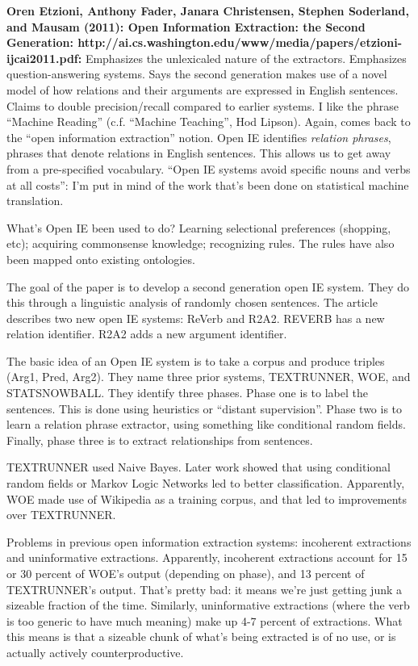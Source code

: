 \textbf{Oren Etzioni, Anthony Fader, Janara Christensen, Stephen
  Soderland, and Mausam (2011): Open Information Extraction: the
  Second Generation:
  http://ai.cs.washington.edu/www/media/papers/etzioni-ijcai2011.pdf:}
Emphasizes the unlexicaled nature of the extractors.  Emphasizes
question-answering systems.  Says the second generation makes use of a
novel model of how relations and their arguments are expressed in
English sentences.  Claims to double precision/recall compared to
earlier systems.  I like the phrase ``Machine Reading''
(c.f. ``Machine Teaching'', Hod Lipson).  Again, comes back to the
``open information extraction'' notion.  Open IE identifies
\emph{relation phrases}, phrases that denote relations in English
sentences.  This allows us to get away from a pre-specified
vocabulary.  ``Open IE systems avoid specific nouns and verbs at all
costs'': I'm put in mind of the work that's been done on statistical
machine translation.

What's Open IE been used to do?  Learning selectional preferences
(shopping, etc); acquiring commonsense knowledge; recognizing rules.
The rules have also been mapped onto existing ontologies.

The goal of the paper is to develop a second generation open IE
system. They do this through a linguistic analysis of randomly chosen
sentences.  The article describes two new open IE systems: ReVerb and
R2A2.  REVERB has a new relation identifier.  R2A2 adds a new argument
identifier.

The basic idea of an Open IE system is to take a corpus and produce
triples (Arg1, Pred, Arg2).  They name three prior systems,
TEXTRUNNER, WOE, and STATSNOWBALL.  They identify three phases.  Phase
one is to label the sentences.  This is done using heuristics or
``distant supervision''.  Phase two is to learn a relation phrase
extractor, using something like conditional random fields.  Finally,
phase three is to extract relationships from sentences.

TEXTRUNNER used Naive Bayes.  Later work showed that using conditional
random fields or Markov Logic Networks led to better classification.
Apparently, WOE made use of Wikipedia as a training corpus, and that
led to improvements over TEXTRUNNER.

Problems in previous open information extraction systems: incoherent
extractions and uninformative extractions.  Apparently, incoherent
extractions account for 15 or 30 percent of WOE's output (depending on
phase), and 13 percent of TEXTRUNNER's output.  That's pretty bad: it
means we're just getting junk a sizeable fraction of the time.
Similarly, uninformative extractions (where the verb is too generic to
have much meaning) make up 4-7 percent of extractions.  What this
means is that a sizeable chunk of what's being extracted is of no use,
or is actually actively counterproductive.

